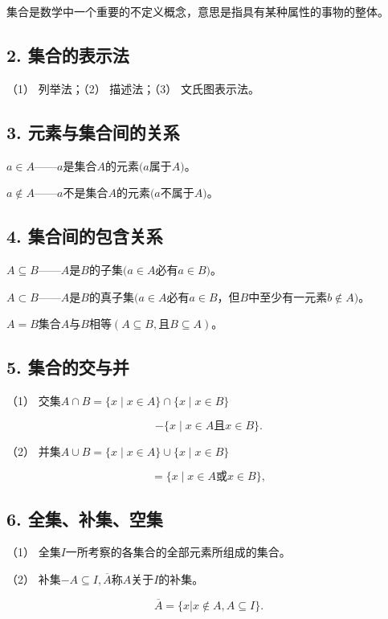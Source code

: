 集合是数学中一个重要的不定义概念，意思是指具有某种属性的事物的整体。

\subsection{2. 集合的表示法}

（1） 列举法；（2） 描述法；（3） 文氏图表示法。

\subsection{3. 元素与集合间的关系}

\(a\in A\)------\(a\)是集合\(A\)的元素\((a\)属于\(A)\)。

\(a\notin A\)------\(a\)不是集合\(A\)的元素\((a\)不属于\(A)\)。

\subsection{4. 集合间的包含关系}

\(A\subseteq B\)------\(A\)是\(B\)的子集\((a \in A\)必有\(a \in B)\)。

\(A\subset B\)------\(A\)是\(B\)的真子集\((a \in A\)必有\(a \in B\)，但\(B\)中至少有一元素\(b \notin A)\)。

\(A = B\)集合\(A\)与\(B\)相等\((A \subseteq B, \text{且} B \subseteq A)\)。

\subsection{5. 集合的交与并}

（1） 交集\(A\cap B=\{x\mid x\in A\}\cap\{x\mid x\in B\}\)

\[
- \{x \mid x \in A \text{且} x \in B \}.
\]

（2） 并集\(A \cup B = \{x \mid x \in A\} \cup \{x \mid x \in B\}\)

\[
= \{x \mid x \in A \text{或} x \in B \},
\]

\subsection{6. 全集、补集、空集}

（1） 全集\(I\)一所考察的各集合的全部元素所组成的集合。

（2） 补集\(-A \subseteq I, \overline{A}\)称\(A\)关于\(I\)的补集。

\[
\overline {{{A}}} = \{x | x \notin A, A \subseteq I \}.
\]

